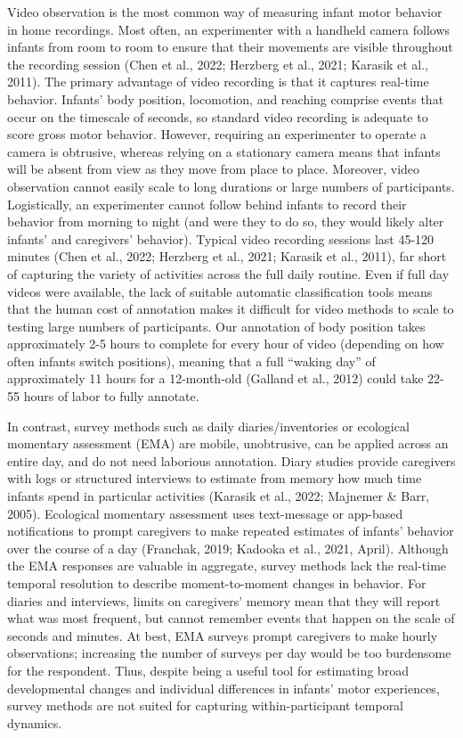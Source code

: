 \documentclass[
  man]{apa6}
\begin{document}
Video observation is the most common way of measuring infant motor behavior in home recordings. Most often, an experimenter with a handheld camera follows infants from room to room to ensure that their movements are visible throughout the recording session (Chen et al., 2022; Herzberg et al., 2021; Karasik et al., 2011). The primary advantage of video recording is that it captures real-time behavior. Infants' body position, locomotion, and reaching comprise events that occur on the timescale of seconds, so standard video recording is adequate to score gross motor behavior. However, requiring an experimenter to operate a camera is obtrusive, whereas relying on a stationary camera means that infants will be absent from view as they move from place to place. Moreover, video observation cannot easily scale to long durations or large numbers of participants. Logistically, an experimenter cannot follow behind infants to record their behavior from morning to night (and were they to do so, they would likely alter infants' and caregivers' behavior). Typical video recording sessions last 45-120 minutes (Chen et al., 2022; Herzberg et al., 2021; Karasik et al., 2011), far short of capturing the variety of activities across the full daily routine. Even if full day videos were available, the lack of suitable automatic classification tools means that the human cost of annotation makes it difficult for video methods to scale to testing large numbers of participants. Our annotation of body position takes approximately 2-5 hours to complete for every hour of video (depending on how often infants switch positions), meaning that a full ``waking day'' of approximately 11 hours for a 12-month-old (Galland et al., 2012) could take 22-55 hours of labor to fully annotate.

In contrast, survey methods such as daily diaries/inventories or ecological momentary assessment (EMA) are mobile, unobtrusive, can be applied across an entire day, and do not need laborious annotation. Diary studies provide caregivers with logs or structured interviews to estimate from memory how much time infants spend in particular activities (Karasik et al., 2022; Majnemer \& Barr, 2005). Ecological momentary assessment uses text-message or app-based notifications to prompt caregivers to make repeated estimates of infants' behavior over the course of a day (Franchak, 2019; Kadooka et al., 2021, April). Although the EMA responses are valuable in aggregate, survey methods lack the real-time temporal resolution to describe moment-to-moment changes in behavior. For diaries and interviews, limits on caregivers' memory mean that they will report what was most frequent, but cannot remember events that happen on the scale of seconds and minutes. At best, EMA surveys prompt caregivers to make hourly observations; increasing the number of surveys per day would be too burdensome for the respondent. Thus, despite being a useful tool for estimating broad developmental changes and individual differences in infants' motor experiences, survey methods are not suited for capturing within-participant temporal dynamics.
\end{document}
